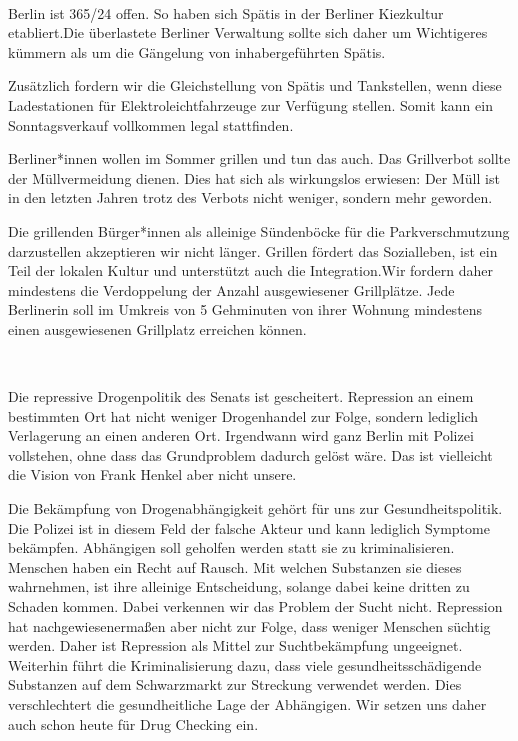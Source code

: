 \documentclass[a4paper,10pt]{article}
\newcommand{\mysection}[1]{{\vspace{1cm}\noindent\color{gray}{\ttfamily\LARGE\raggedright #1}\\\medskip}}
\newcommand{\abschnitt}[2]{%
\mysection{\raggedright #1}%
\begin{figure}[t]%
\vspace*{-2.7cm}%
\hspace*{-2.1cm}%
\texttt{[image: images/blog/small/\#2]} %
\end{figure}%
}
\newcommand{\querschlaeger}[1]{
\begin{figure}[t]%
\vspace*{-2.7cm}%
\hspace*{-2.1cm}%
\texttt{[image: images/blog/small/\#1]} %
\end{figure}%
}
\begin{document}
\mysection{Kiezleben}

Berlin ist 365/24 offen. So haben sich Spätis in der Berliner Kiezkultur
etabliert.Die überlastete Berliner Verwaltung sollte sich daher um
Wichtigeres kümmern als um die Gängelung von inhabergeführten Spätis.

Zusätzlich fordern wir die Gleichstellung von Spätis und Tankstellen,
wenn diese Ladestationen für Elektroleichtfahrzeuge zur Verfügung
stellen. Somit kann ein Sonntagsverkauf vollkommen legal stattfinden.

Berliner*innen wollen im Sommer grillen und tun das auch. Das
Grillverbot sollte der Müllvermeidung dienen. Dies hat sich als
wirkungslos erwiesen: Der Müll ist in den letzten Jahren trotz des
Verbots nicht weniger, sondern mehr geworden.

Die grillenden Bürger*innen als alleinige Sündenböcke für die
Parkverschmutzung darzustellen akzeptieren wir nicht länger. Grillen
fördert das Sozialleben, ist ein Teil der lokalen Kultur und unterstützt
auch die Integration.Wir fordern daher mindestens die Verdoppelung der
Anzahl ausgewiesener Grillplätze. Jede Berlinerin soll im Umkreis von 5
Gehminuten von ihrer Wohnung mindestens einen ausgewiesenen Grillplatz
erreichen können.

\mysection{Sucht-{\raisebox{-.5cm}{~}} und Drogenpolitik}

Die repressive Drogenpolitik des Senats ist gescheitert. Repression an
einem bestimmten Ort hat nicht weniger Drogenhandel zur Folge, sondern
lediglich Verlagerung an einen anderen Ort. Irgendwann wird ganz Berlin
mit Polizei vollstehen, ohne dass das Grundproblem dadurch gelöst wäre.
Das ist vielleicht die Vision von Frank Henkel aber nicht unsere.

Die Bekämpfung von Drogenabhängigkeit gehört für uns zur
Gesundheitspolitik. Die Polizei ist in diesem Feld der falsche Akteur
und kann lediglich Symptome bekämpfen. Abhängigen soll geholfen werden
statt sie zu kriminalisieren. Menschen haben ein Recht auf Rausch. Mit
welchen Substanzen sie dieses wahrnehmen, ist ihre alleinige
Entscheidung, solange dabei keine dritten zu Schaden kommen. Dabei
verkennen wir das Problem der Sucht nicht. Repression hat
nachgewiesenermaßen aber nicht zur Folge, dass weniger Menschen süchtig
werden. Daher ist Repression als Mittel zur Suchtbekämpfung ungeeignet.
Weiterhin führt die Kriminalisierung dazu, dass viele
gesundheitsschädigende Substanzen auf dem Schwarzmarkt zur Streckung
verwendet werden. Dies verschlechtert die gesundheitliche Lage der
Abhängigen. Wir setzen uns daher auch schon heute für Drug Checking ein.
\end{document}
